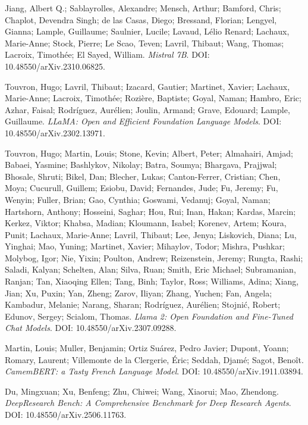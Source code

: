 \documentclass[12pt]{article}
\begin{document}
\begin{thebibliography}{9}
Jiang, Albert Q.; Sablayrolles, Alexandre; Mensch, Arthur; Bamford, Chris; Chaplot, Devendra Singh; de las Casas, Diego; Bressand, Florian; Lengyel, Gianna; Lample, Guillaume; Saulnier, Lucile; Lavaud, Lélio Renard; Lachaux, Marie-Anne; Stock, Pierre; Le Scao, Teven; Lavril, Thibaut; Wang, Thomas; Lacroix, Timothée; El Sayed, William.
\textit{Mistral 7B}.
DOI: 10.48550/arXiv.2310.06825.

Touvron, Hugo; Lavril, Thibaut; Izacard, Gautier; Martinet, Xavier; Lachaux, Marie-Anne; Lacroix, Timothée; Rozière, Baptiste; Goyal, Naman; Hambro, Eric; Azhar, Faisal; Rodríguez, Aurélien; Joulin, Armand; Grave, Edouard; Lample, Guillaume.  
\textit{LLaMA: Open and Efficient Foundation Language Models}.
DOI: 10.48550/arXiv.2302.13971.

Touvron, Hugo; Martin, Louis; Stone, Kevin; Albert, Peter; Almahairi, Amjad; Babaei, Yasmine; Bashlykov, Nikolay; Batra, Soumya; Bhargava, Prajjwal; Bhosale, Shruti; Bikel, Dan; Blecher, Lukas; Canton-Ferrer, Cristian; Chen, Moya; Cucurull, Guillem; Esiobu, David; Fernandes, Jude; Fu, Jeremy; Fu, Wenyin; Fuller, Brian; Gao, Cynthia; Goswami, Vedanuj; Goyal, Naman; Hartshorn, Anthony; Hosseini, Saghar; Hou, Rui; Inan, Hakan; Kardas, Marcin; Kerkez, Viktor; Khabsa, Madian; Kloumann, Isabel; Korenev, Artem; Koura, Punit; Lachaux, Marie-Anne; Lavril, Thibaut; Lee, Jenya; Liskovich, Diana; Lu, Yinghai; Mao, Yuning; Martinet, Xavier; Mihaylov, Todor; Mishra, Pushkar; Molybog, Igor; Nie, Yixin; Poulton, Andrew; Reizenstein, Jeremy; Rungta, Rashi; Saladi, Kalyan; Schelten, Alan; Silva, Ruan; Smith, Eric Michael; Subramanian, Ranjan; Tan, Xiaoqing Ellen; Tang, Binh; Taylor, Ross; Williams, Adina; Xiang, Jian; Xu, Puxin; Yan, Zheng; Zarov, Iliyan; Zhang, Yuchen; Fan, Angela; Kambadur, Melanie; Narang, Sharan; Rodríguez, Aurélien; Stojnić, Robert; Edunov, Sergey; Scialom, Thomas.  
\textit{Llama 2: Open Foundation and Fine-Tuned Chat Models}.
DOI: 10.48550/arXiv.2307.09288.

Martin, Louis; Muller, Benjamin; Ortiz Suárez, Pedro Javier; Dupont, Yoann; Romary, Laurent; Villemonte de la Clergerie, Éric; Seddah, Djamé; Sagot, Benoît.  
\textit{CamemBERT: a Tasty French Language Model}.
DOI: 10.48550/arXiv.1911.03894.

Du, Mingxuan; Xu, Benfeng; Zhu, Chiwei; Wang, Xiaorui; Mao, Zhendong.  
\textit{DeepResearch Bench: A Comprehensive Benchmark for Deep Research Agents}.
DOI: 10.48550/arXiv.2506.11763.


\end{thebibliography}
\end{document}
